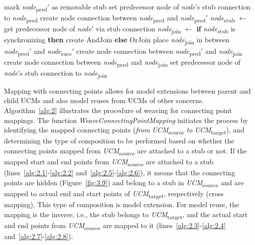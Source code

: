\begin{algorithm}
\begin{algorithmic}[1]
			 \label{alg:2.23}
				\State mark \emph{node}\textsubscript{pred}$'$ as removable stub
				\State set predecessor node of \emph{node}'s stub connection to \emph{node}\textsubscript{pred} \label{alg:2.24}
			 \label{alg:2.25}
				\State create node connection between \emph{node}\textsubscript{pred} and \emph{node}\textsubscript{pred}$'$ \label{alg:2.26}
			\Else \label{alg:2.27}
				\State \emph{node}\textsubscript{stub} $\gets$ get predecessor node of \emph{node}$'$ via stub connection
				\State \emph{node}\textsubscript{join} $\gets$ \textbf{if} \emph{node}\textsubscript{stub} is synchronizing \textbf{then} create {\cls AndJoin} \textbf{else} {\cls OrJoin}
				\State place \emph{node}\textsubscript{join} in between \emph{node}\textsubscript{pred}$'$ and \emph{node}\textsubscript{succ}$'$
				\State create node connection between \emph{node}\textsubscript{pred}$'$ and \emph{node}\textsubscript{join}
				\State create node connection between \emph{node}\textsubscript{pred} and \emph{node}\textsubscript{join}
				\State set predecessor node of \emph{node}'s stub connection to \emph{node}\textsubscript{join}
			\EndIf \label{alg:2.28}
		\EndFunction
	\end{algorithmic}
\end{algorithm}

Mapping with connecting points allows for model extensions between parent and child UCMs and also model reuses from UCMs of other concerns. Algorithm~\ref{alg:2} illustrates the procedure of weaving for connecting point mappings. The function \emph{WeaveConnectingPointMapping} initiates the process by identifying the mapped connecting points (\emph{from} \emph{UCM}\textsubscript{source} \emph{to} \emph{UCM}\textsubscript{target}), and determining the type of composition to be performed based on whether the connecting points mapped from \emph{UCM}\textsubscript{source} are attached to a stub or not. If the mapped start and end points from \emph{UCM}\textsubscript{source} are attached to a stub (lines~\ref{alg:2.1}-\ref{alg:2.2} and~\ref{alg:2.5}-\ref{alg:2.6}), it means that the connecting points are hidden (Figure~\ref{fig:3.9}) and belong to a stub in \emph{UCM}\textsubscript{source} and are mapped to actual end and start points of \emph{UCM}\textsubscript{target}, respectively (cross mapping). This type of composition is model extension. For model reuse, the mapping is the inverse, i.e., the stub belongs to \emph{UCM}\textsubscript{target}, and the actual start and end points from \emph{UCM}\textsubscript{source} are mapped to it (lines~\ref{alg:2.3}-\ref{alg:2.4} and~\ref{alg:2.7}-\ref{alg:2.8}).

